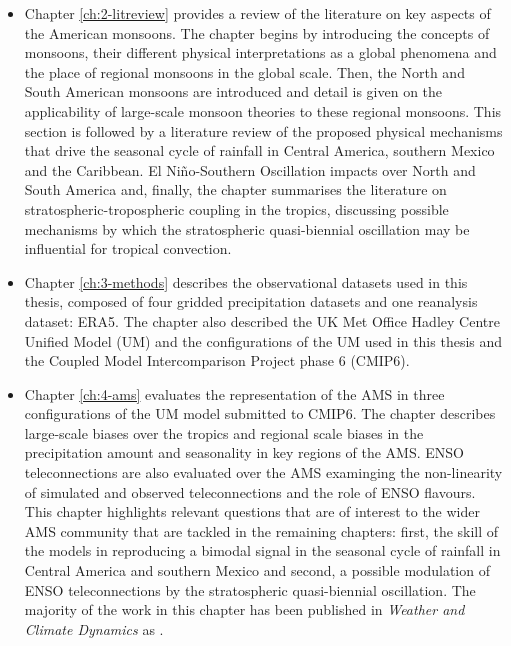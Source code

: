\begin{itemize}
\item Chapter \ref{ch:2-litreview} provides a review of the literature on key aspects of the American monsoons. The chapter begins by introducing the concepts of monsoons, their different physical interpretations as a global phenomena and the place of regional monsoons in the global scale. Then, the North and South American monsoons are introduced and detail is given on the applicability of large-scale monsoon theories to these regional monsoons. This section is followed by a literature review of the proposed physical mechanisms that drive the seasonal cycle of rainfall in Central America, southern Mexico and the Caribbean. El Niño-Southern Oscillation  impacts over North and South America and, finally, the chapter summarises the literature on stratospheric-tropospheric coupling in the tropics, discussing possible mechanisms by which the stratospheric quasi-biennial oscillation may be influential for tropical convection. 

\item  Chapter \ref{ch:3-methods} describes the observational datasets used in this thesis, composed of four gridded precipitation datasets and one reanalysis dataset: ERA5. The chapter also described the UK Met Office Hadley Centre Unified Model (UM) and the configurations of the UM used in this thesis and the Coupled Model Intercomparison Project phase 6 (CMIP6). 

\item Chapter \ref{ch:4-ams} evaluates the representation of the AMS  in three configurations of the UM model submitted to CMIP6. The chapter describes large-scale biases over the tropics and regional scale biases in the precipitation amount and seasonality in key regions of the AMS. 
ENSO teleconnections are also evaluated over the AMS examinging the non-linearity of simulated and observed teleconnections and the role of ENSO flavours. This chapter highlights relevant questions that are of interest to the wider AMS community that are tackled in the remaining chapters: first, the skill of the models in reproducing a bimodal signal in the seasonal cycle of rainfall in Central America and southern Mexico and second, a possible modulation of ENSO teleconnections by the stratospheric quasi-biennial oscillation.
The majority of the work in this chapter has been published in \textit{Weather and Climate Dynamics} as \cite{garciafranco2020}.


\end{itemize}
